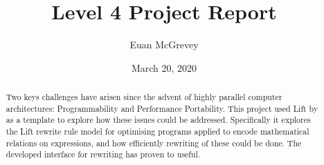 \documentclass{l4proj}
\begin{document}
\title{Level 4 Project Report}
\author{Euan McGrevey}
\date{March 20, 2020}

\maketitle

\begin{abstract}

    Two keys challenges have arisen since the advent of highly parallel computer architectures: Programmability and Performance Portability. This project used Lift by \citet{steuwer_improving_nodate} as a template to explore how these issues could be addressed. Specifically it explores the Lift rewrite rule model for optimising programs applied to encode mathematical relations on expressions, and how efficiently rewriting of these could be done. The developed interface for rewriting has proven to useful.

\end{abstract}


%
%
\def\consentname {Euan McGrevey} %
\def\consentdate {30 January 2020} %
%
\educationalconsent


\tableofcontents
\end{document}
